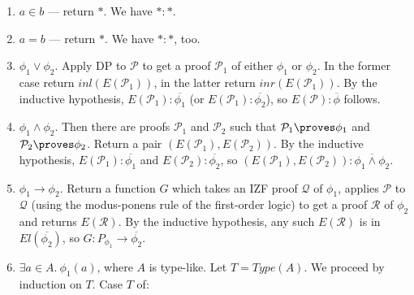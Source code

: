 \documentclass{LMCS}
\newcommand{\ov}[1]{\ensuremath{\overline{#1}}}
\newcommand{\p}{\proves}
\newcommand{\sr}[1]{\SB{#1}_\rho}
\newcommand{\ST}{*}
\newcommand{\st}{*}
\newcommand{\pr}[1]{\mathcal{#1}}
\begin{document}
\begin{enumerate}[$\bullet$]
\item $a \in b$ --- return $\st$. We have $\st : \ST$.
\item $a = b$ --- return $\st$. We have $\st : \ST$, too. 
\item $\phi_1 \lor \phi_2$. Apply DP to $\pr{P}$ to get a proof $\pr{P}_1$ of either
$\phi_1$ or $\phi_2$. In the former case return $inl(E(\pr{P}_1))$, in the latter
return $inr(E(\pr{P}_1))$. By the inductive hypothesis, $E(\pr{P}_1) : \ov{\phi_1}$ (or
$E(\pr{P}_1) : \ov{\phi_2}$), so $E(\pr{P}) : \ov{\phi}$ follows. 
\item $\phi_1 \land \phi_2$. Then there are proofs $\pr{P}_1$ and $\pr{P}_2$ such that
$\pr{P}_1 \p \phi_1$ and $\pr{P}_2 \p \phi_2$. Return a pair $(E(\pr{P}_1),
E(\pr{P}_2))$. By the inductive hypothesis, $E(\pr{P}_1) : \ov{\phi_1}$ and
$E(\pr{P}_2) : \ov{\phi_2}$, so
$(E(\pr{P}_1), E(\pr{P}_2)) : \ov{\phi_1 \land \phi_2}$. 
\item $\phi_1 \to \phi_2$. Return a function $G$ which takes an IZF proof
$\pr{Q}$ of $\phi_1$, applies $\pr{P}$ to $\pr{Q}$ (using the modus-ponens rule of the first-order logic) to get a proof
$\pr{R}$ of $\phi_2$ and returns $E(\pr{R})$. By the inductive hypothesis, any
such $E(\pr{R})$
is in $El(\ov{\phi_2})$, so $G : P_{\phi_1} \to \ov{\phi_2}$.
\item $\exists a \in A.\ \phi_1(a)$, where $A$ is type-like. Let $T = Type(A)$.
We proceed by induction on $T$. Case $T$ of:
\end{enumerate}
\end{document}
